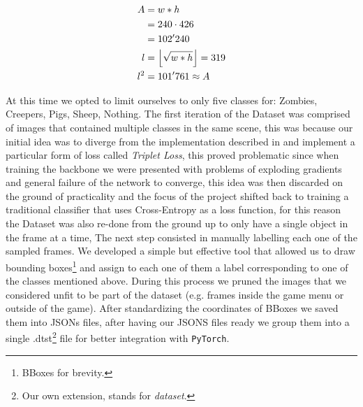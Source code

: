 \documentclass[10pt,journal,cspaper,compsoc]{IEEEtran}
\newcommand{\code}[1]{\texttt{#1}}
\DeclarePairedDelimiter\floor{\lfloor}{\rfloor}
\begin{document}
    \begin{equation}\label{eq:area}
        \begin{aligned}
            A &= w * h \\
            &= 240 \cdot 426\\ 
            &= 102'240\\
            l &= \floor*{\sqrt{w * h}} = 319\\
            l^2 &= 101'761 \approx A\\
        \end{aligned}
    \end{equation} 
    
    At this time we opted to limit ourselves to only five classes for: Zombies, Creepers, Pigs, Sheep, Nothing.
    The first iteration of the Dataset was comprised of images that contained multiple classes in the same scene, this was because our initial idea was to diverge from the implementation described in \cite{arxiv:FasterRCNN} and implement a particular form of loss called \emph{Triplet Loss}\cite{Chechik:Triplet}, this proved problematic since when training the backbone we were presented with problems of exploding gradients and general failure of the network to converge, this idea was then discarded on the ground of practicality and the focus of the 
    project shifted back to training a traditional classifier that uses Cross-Entropy as a loss function, for this reason the Dataset was also re-done from the ground up to only have a single object in the frame at a time,
    The next step consisted in manually labelling each one of the sampled frames. We developed a simple but effective tool that allowed us to draw bounding boxes\footnote{BBoxes for brevity.} and assign to each one of them a label corresponding to one of the classes mentioned above. During this process we pruned the images that we considered
    unfit to be part of the dataset (e.g. frames inside the game menu or outside of the game). After standardizing the coordinates of BBoxes we saved them into JSONs files, after having our JSONS files ready we group them into a single .dtst\footnote{Our own extension, stands for \emph{dataset}.} file for better integration with \code{PyTorch}.
    
\end{document}
